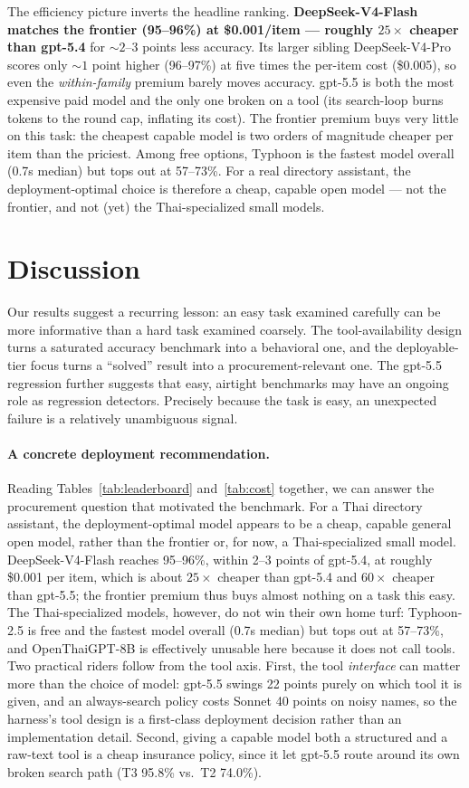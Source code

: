 \documentclass[11pt]{article}
\begin{document}
The efficiency picture inverts the headline ranking. \textbf{DeepSeek-V4-Flash matches the frontier
(95--96\%) at \$0.001/item --- roughly $25\times$ cheaper than gpt-5.4} for ${\sim}2$--3 points less
accuracy. Its larger sibling DeepSeek-V4-Pro scores only ${\sim}1$ point higher (96--97\%) at five times
the per-item cost (\$0.005), so even the \emph{within-family} premium barely moves accuracy. gpt-5.5 is
both the most expensive paid model and the only one broken on a tool (its search-loop burns tokens to
the round cap, inflating its cost). The frontier premium buys very little on this task: the cheapest
capable model is two orders of magnitude cheaper per item than the priciest. Among free options, Typhoon
is the fastest model overall (0.7s median) but tops out at 57--73\%. For a real directory assistant, the
deployment-optimal choice is therefore a cheap, capable open model --- not the frontier, and not (yet)
the Thai-specialized small models.

\section{Discussion}

Our results suggest a recurring lesson: an easy task examined carefully can be more informative than a
hard task examined coarsely. The tool-availability design turns a saturated accuracy benchmark into a
behavioral one, and the deployable-tier focus turns a ``solved'' result into a procurement-relevant one.
The gpt-5.5 regression further suggests that easy, airtight benchmarks may have an ongoing role as
regression detectors. Precisely because the task is easy, an unexpected failure is a relatively
unambiguous signal.

\paragraph{A concrete deployment recommendation.} Reading Tables~\ref{tab:leaderboard}
and~\ref{tab:cost} together, we can answer the procurement question that motivated the benchmark. For a
Thai directory assistant, the deployment-optimal model appears to be a cheap, capable general open
model, rather than the frontier or, for now, a Thai-specialized small model. DeepSeek-V4-Flash reaches
95--96\%, within 2--3 points of gpt-5.4, at roughly \$0.001 per item, which is about $25\times$ cheaper
than gpt-5.4 and $60\times$ cheaper than gpt-5.5; the frontier premium thus buys almost nothing on a
task this easy. The Thai-specialized models, however, do not win their own home turf: Typhoon-2.5 is
free and the fastest model overall (0.7s median) but tops out at 57--73\%, and OpenThaiGPT-8B is
effectively unusable here because it does not call tools. Two practical riders follow from the tool
axis. First, the tool \emph{interface} can matter more than the choice of model: gpt-5.5 swings 22 points
purely on which tool it is given, and an always-search policy costs Sonnet 40 points on noisy names, so
the harness's tool design is a first-class deployment decision rather than an implementation detail.
Second, giving a capable model both a structured and a raw-text tool is a cheap insurance policy, since
it let gpt-5.5 route around its own broken search path (T3 95.8\% vs.\ T2 74.0\%).
\end{document}
